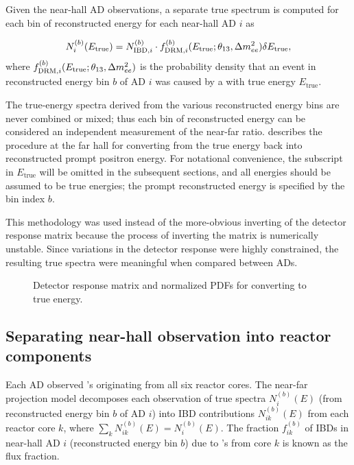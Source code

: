 Given the near-hall AD observations,
a separate true \nuebar{} spectrum is computed
for each bin of reconstructed energy for each near-hall AD $i$ as

\begin{equation}
    N_i^{(b)}(E_{\text{true}}) = N_{\text{IBD},i}^{(b)}
    \cdot f_{\text{DRM},i}^{(b)}(E_{\text{true}}; \theta_{13}, \Delta m^2_{ee}) \delta E_{\text{true}},
\end{equation}
where $f_{\text{DRM},i}^{(b)}(E_{\text{true}}; \theta_{13}, \Delta m^2_{ee})$ is the probability density
that an event in reconstructed energy bin $b$
of AD $i$
was caused by a \nuebar{} with true energy $E_{\text{true}}$.

The true-energy spectra derived from the various reconstructed energy bins
are never combined or mixed;
thus each bin of reconstructed energy can be considered an independent measurement
of the near-far ratio.
 describes the procedure at the far hall
for converting from the true \nuebar{} energy back into reconstructed prompt positron energy.
For notational convenience, the subscript in $E_{\text{true}}$ will be omitted
in the subsequent sections,
and all energies should be assumed to be true \nuebar{} energies;
the prompt reconstructed energy is specified by the bin index $b$.

This methodology was used instead of the more-obvious
inverting of the detector response matrix
because the process of inverting the matrix is numerically unstable.
Since variations in the detector response were highly constrained,
the resulting true \nuebar{} spectra were meaningful when compared between ADs.


\begin{figure}
    \caption{Detector response matrix and normalized PDFs
    for converting to true \nuebar{} energy.}
    \label{fig:drm}
\end{figure}


\subsection{Separating near-hall observation into reactor components}
\label{subsec:flux_fraction}

Each AD observed \nuebar{}'s originating from all six reactor cores.
The near-far projection model decomposes each observation
of true \nuebar{} spectra $N_i^{(b)}(E)$
(from reconstructed energy bin $b$ of AD $i$)
into IBD contributions $N_{ik}^{(b)}(E)$ from each reactor core $k$,
where $\sum_k N_{ik}^{(b)}(E) = N_i^{(b)}(E)$.
The fraction $f_{ik}^{(b)}$ of IBDs in near-hall AD $i$
(reconstructed energy bin $b$)
due to \nuebar{}'s from core $k$ is known as the flux fraction.

